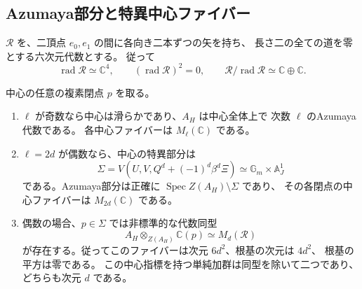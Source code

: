 \subsection{Azumaya部分と特異中心ファイバー}

$\mathcal R$ を、二頂点 $e_0,e_1$ の間に各向き二本ずつの矢を持ち、
長さ二の全ての道を零とする六次元代数とする。
従って
\[
 \operatorname{rad}\mathcal R\simeq\mathbb C^4,\qquad
 (\operatorname{rad}\mathcal R)^2=0,\qquad
 \mathcal R/\operatorname{rad}\mathcal R\simeq\mathbb C\oplus\mathbb C.
\]

\begin{theorem}[中心特異点と単純加群の分裂]
\label{thm:root-Azumaya-v38}
中心の任意の複素閉点 $p$ を取る。
\begin{enumerate}
\item $\ell$ が奇数なら中心は滑らかであり、$A_H$ は中心全体上で
次数 $\ell$ のAzumaya代数である。
各中心ファイバーは $M_\ell(\mathbb C)$ である。
\item $\ell=2d$ が偶数なら、中心の特異部分は
\[
 \Sigma=V(U,V,Q^d+(-1)^d\beta^d\Xi)
 \simeq\mathbb G_m\times\mathbb A^1_J
\]
である。Azumaya部分は正確に $\operatorname{Spec}Z(A_H)\setminus\Sigma$ であり、
その各閉点の中心ファイバーは $M_{2d}(\mathbb C)$ である。
\item 偶数の場合、$p\in\Sigma$ では非標準的な代数同型
\begin{equation}
\label{eq:root-singular-fiber-v38}
 A_H\otimes_{Z(A_H)}\mathbb C(p)\simeq M_d(\mathcal R)
\end{equation}
が存在する。従ってこのファイバーは次元 $6d^2$、根基の次元は $4d^2$、
根基の平方は零である。
この中心指標を持つ単純加群は同型を除いて二つであり、どちらも次元 $d$ である。
\end{enumerate}
\end{theorem}

